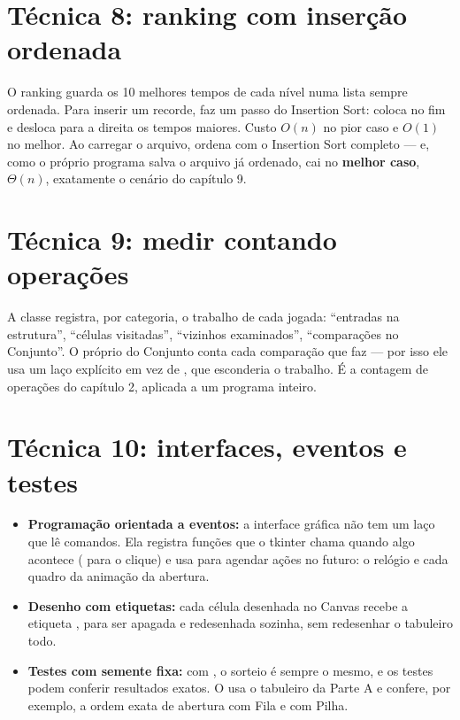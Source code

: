 \section{Técnica 8: ranking com inserção ordenada}

O ranking guarda os 10 melhores tempos de cada nível numa lista sempre ordenada. Para inserir um
recorde, faz um passo do Insertion Sort: coloca no fim e desloca para a direita os tempos maiores.
Custo $O(n)$ no pior caso e $O(1)$ no melhor. Ao carregar o arquivo, ordena com o Insertion Sort
completo — e, como o próprio programa salva o arquivo já ordenado, cai no \textbf{melhor caso},
$\Theta(n)$, exatamente o cenário do capítulo 9.

\section{Técnica 9: medir contando operações}

A classe  registra, por categoria, o trabalho de cada jogada:
\enquote{entradas na estrutura}, \enquote{células visitadas}, \enquote{vizinhos examinados},
\enquote{comparações no Conjunto}. O próprio  do Conjunto conta cada
comparação que faz — por isso ele usa um laço explícito em vez de , que
esconderia o trabalho. É a contagem de operações do capítulo 2, aplicada a um programa inteiro.

\section{Técnica 10: interfaces, eventos e testes}

\begin{itemize}
  \item \textbf{Programação orientada a eventos:} a interface gráfica não tem um laço que lê
        comandos. Ela registra funções que o tkinter chama quando algo acontece
        ( para o clique) e usa 
        para agendar ações no futuro: o relógio e cada quadro da animação da abertura.
  \item \textbf{Desenho com etiquetas:} cada célula desenhada no Canvas recebe a etiqueta
        , para ser apagada e redesenhada sozinha, sem redesenhar o tabuleiro todo.
  \item \textbf{Testes com semente fixa:} com , o sorteio é sempre o
        mesmo, e os testes podem conferir resultados exatos. O  usa o tabuleiro da
        Parte A e confere, por exemplo, a ordem exata de abertura com Fila e com Pilha.
\end{itemize}


